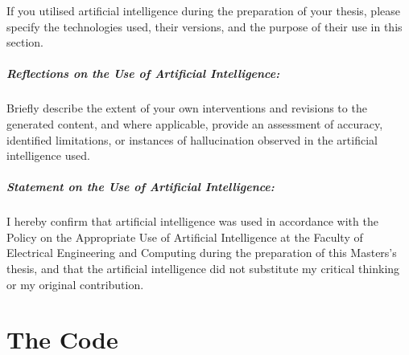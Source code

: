 \documentclass[masterthesis]{fer}
\begin{document}





\begin{statementonai}

  If you utilised artificial intelligence during the preparation of your thesis,
  please specify the technologies used, their versions, and the purpose of their use in this section.

  \paragraph{Reflections on the Use of Artificial Intelligence:}
  Briefly describe the extent of your own interventions and revisions to the generated content, and where applicable,
  provide an assessment of accuracy, identified limitations, or instances of hallucination observed in the artificial intelligence used.

  \paragraph{Statement on the Use of Artificial Intelligence:}
  I hereby confirm that artificial intelligence was used in accordance with
  the Policy on the Appropriate Use of Artificial Intelligence at the Faculty of Electrical Engineering and Computing
  during the preparation of this Masters's thesis,
  and that the artificial intelligence did not substitute my critical thinking or my original contribution.

\end{statementonai}



\backmatter

\chapter{The Code}

\Blindtext
\end{document}
